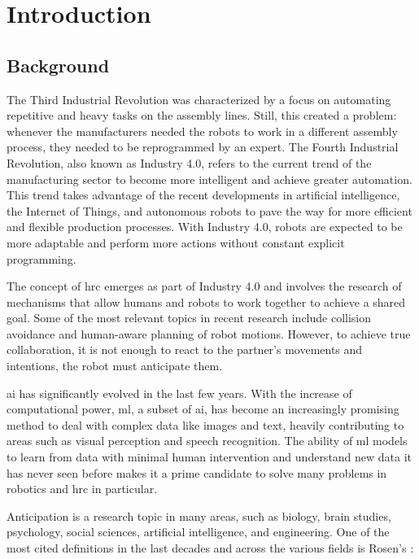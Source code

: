 \chapter{Introduction}
\label{chapter:introduction}

\section{Background}

The Third Industrial Revolution was characterized by a focus on automating repetitive and heavy tasks on the assembly lines. Still, this created a problem: whenever the manufacturers needed the robots to work in a different assembly process, they needed to be reprogrammed by an expert. The Fourth Industrial Revolution, also known as Industry 4.0, refers to the current trend of the manufacturing sector to become more intelligent and achieve greater automation. This trend takes advantage of the recent developments in artificial intelligence, the Internet of Things, and autonomous robots to pave the way for more efficient and flexible production processes. With Industry 4.0, robots are expected to be more adaptable and perform more actions without constant explicit programming.

The concept of \acf{hrc} emerges as part of Industry 4.0 and involves the research of mechanisms that allow humans and robots to work together to achieve a shared goal. Some of the most relevant topics in recent research include collision avoidance and human-aware planning of robot motions. However, to achieve true collaboration, it is not enough to react to the partner’s movements and intentions, the robot must anticipate them.

\acf{ai} has significantly evolved in the last few years. With the increase of computational power, \acf{ml}, a subset of \acs{ai}, has become an increasingly promising method to deal with complex data like images and text, heavily contributing to areas such as visual perception and speech recognition. The ability of \acs{ml} models to learn from data with minimal human intervention and understand new data it has never seen before makes it a prime candidate to solve many problems in robotics and \acs{hrc} in particular.

Anticipation is a research topic in many areas, such as biology, brain studies, psychology, social sciences, artificial intelligence, and engineering. One of the most cited definitions in the last decades and across the various fields is Rosen's \cite{Rosen1985}:

